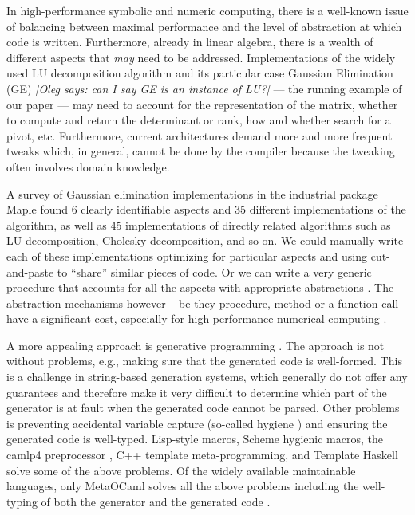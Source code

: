 \documentclass[draft]{elsart}
\newcommand{\oleg}[1]{{\it [Oleg says: #1]}}
\begin{document}
In high-performance symbolic and numeric computing, there is a
well-known issue of balancing between maximal performance and the
level of abstraction at which code is written.  Furthermore, already
in linear algebra, there is a wealth of different aspects that
\emph{may} need to be addressed. Implementations of the
widely used LU decomposition algorithm and its particular case Gaussian 
Elimination (GE) \oleg{can I say GE is an instance of LU?} --- the running
example of our paper --- may need to account for the representation of
the matrix, whether to compute and return the determinant or rank, how
and whether search for a pivot, etc. Furthermore, current architectures
demand more and more frequent tweaks which, in general, cannot be done by the
compiler because the tweaking often involves domain knowledge. 

A survey \cite{Carette06} of
Gaussian elimination implementations in the industrial package Maple
\cite{Monagan:2001:M7P}
found 6 clearly identifiable aspects and 35 different implementations of the
algorithm, as well as 45 implementations of directly related algorithms such as
LU decomposition, Cholesky decomposition, and so on.  We could
manually write each of these implementations optimizing for particular aspects
and using cut-and-paste to ``share'' similar pieces of code.
Or we can write a very generic procedure that accounts for
all the aspects with appropriate abstractions \cite{Gruntz:1994:IG,Axiom}. The
abstraction mechanisms however -- be they procedure, method or a
function call -- have a significant cost, especially for
high-performance numerical computing \cite{Carette06}. 

A more appealing approach is generative programming
\cite{Czarnecki,Veldhuizen:1998:ISCOPE,musser89generic,musser94algorithmoriented,BOOST,POOMA,ATLAS}.
The approach is not without problems, e.g., making sure that the
generated code is well-formed. This is a challenge in string-based
generation systems, which generally do not offer any guarantees and
therefore make it very difficult to determine which part of the
generator is at fault when the generated code cannot be parsed. Other
problems is preventing accidental variable capture (so-called hygiene
\cite{HygienicMacros}) and ensuring the generated code is
well-typed. Lisp-style macros, Scheme hygienic macros, the camlp4
preprocessor \cite{camlp4}, C++ template meta-programming, and Template
Haskell \cite{conf/dagstuhl/CzarneckiOST03} solve some of the above
problems. Of the widely available maintainable languages, only
MetaOCaml \cite{CTHL03,metaocaml-org}  solves all the above problems
including the well-typing of both the generator and 
the generated code \cite{TahaSheard97,TahaThesis}.
\end{document}

